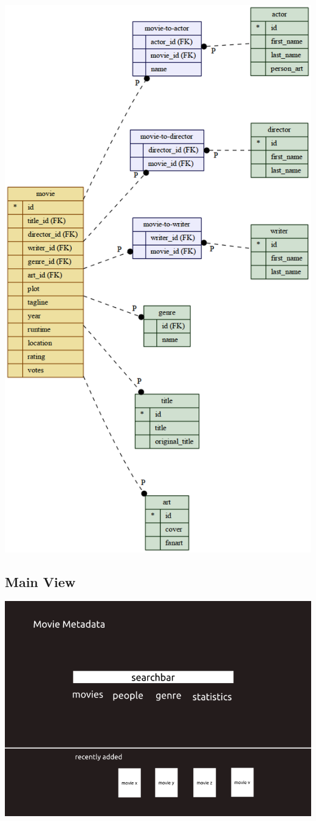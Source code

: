 \includegraphics[scale=0.5]{../pics/dataschema}

\subsection{Main View}
\includegraphics[width=\textwidth]{../pics/mainview}
